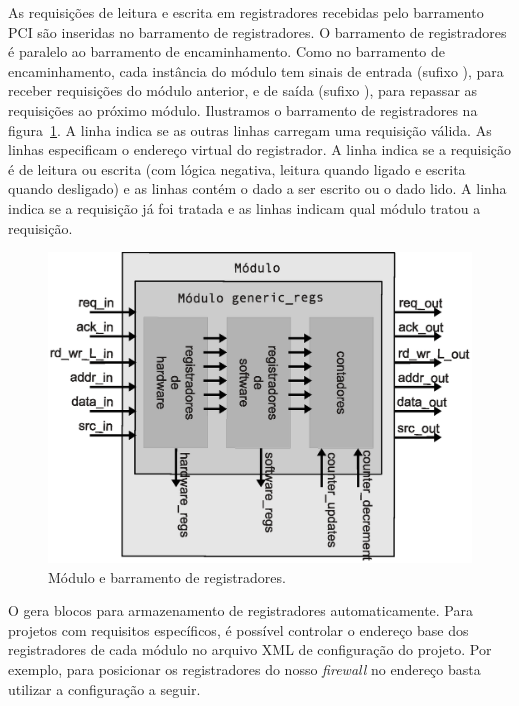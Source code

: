 As requisições de leitura e escrita em registradores recebidas pelo
barramento PCI são inseridas no barramento de registradores.  O
barramento de registradores é paralelo ao barramento de
encaminhamento.  Como no barramento de encaminhamento, cada
instância do módulo  tem sinais de entrada
(sufixo ), para receber requisições do módulo anterior, e
de saída (sufixo ), para repassar as requisições ao
próximo módulo.  Ilustramos o barramento de registradores na
figura~\ref{fig:impl.regs.bus}.  A linha  indica se as
outras linhas carregam uma requisição válida.  As linhas 
especificam o endereço virtual do registrador.  A linha
 indica se a requisição é de leitura ou escrita (com
lógica negativa, leitura quando ligado e escrita quando desligado) e
as linhas  contém o dado a ser escrito ou o dado lido.  A
linha  indica se a requisição já foi tratada e as linhas
 indicam qual módulo tratou a requisição.

\begin{figure}
\centering
\includegraphics[scale=0.6,angle=0]{figures/modulos/genregister.eps}
\caption{Módulo  e barramento de registradores.}
\label{fig:impl.regs.bus}
\end{figure}

O  gera blocos para armazenamento de
registradores automaticamente.  Para projetos com requisitos
específicos, é possível controlar o endereço base dos registradores
de cada módulo no arquivo XML de configuração do projeto.  Por
exemplo, para posicionar os registradores do nosso \emph{firewall}
no endereço  basta utilizar a configuração a seguir.

